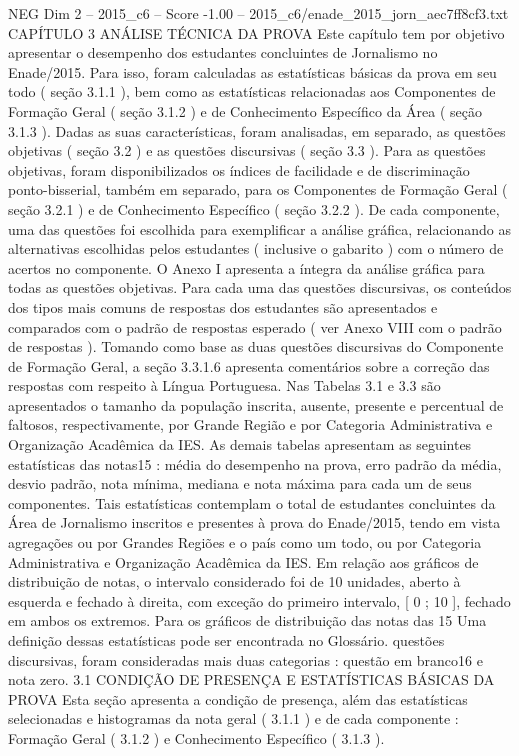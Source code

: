 \begin{textsample}{NEG Dim 2 – 2015\_c6 – Score -1.00 – 2015\_c6/enade\_2015\_jorn\_aec7ff8cf3.txt}  \label{ex:f2_neg_200}
CAPÍTULO 3 ANÁLISE TÉCNICA DA PROVA Este capítulo tem por objetivo apresentar o desempenho dos estudantes concluintes de Jornalismo no Enade/2015.
Para isso, foram calculadas as estatísticas básicas da prova em seu todo ( seção 3.1.1 ), bem como as estatísticas relacionadas aos Componentes de Formação Geral ( seção 3.1.2 ) e de Conhecimento Específico da Área ( seção 3.1.3 ).
Dadas as suas características, foram analisadas, em separado, as questões objetivas ( seção 3.2 ) e as questões discursivas ( seção 3.3 ).
Para as questões objetivas, foram disponibilizados os índices de facilidade e de discriminação ponto-bisserial, também em separado, para os Componentes de Formação Geral ( seção 3.2.1 ) e de Conhecimento Específico ( seção 3.2.2 ).
De cada componente, uma das questões foi escolhida para exemplificar a análise gráfica, relacionando as alternativas escolhidas pelos estudantes ( inclusive o gabarito ) com o número de acertos no componente.
O Anexo I apresenta a íntegra da análise gráfica para todas as questões objetivas.
Para cada uma das questões discursivas, os conteúdos dos tipos mais comuns de respostas dos estudantes são apresentados e comparados com o padrão de respostas esperado ( ver Anexo VIII com o padrão de respostas ).
Tomando como base as duas questões discursivas do Componente de Formação Geral, a seção 3.3.1.6 apresenta comentários sobre a correção das respostas com respeito à Língua Portuguesa.
Nas Tabelas 3.1 e 3.3 são apresentados o tamanho da população inscrita, ausente, presente e percentual de faltosos, respectivamente, por Grande Região e por Categoria Administrativa e Organização Acadêmica da IES.
As demais tabelas apresentam as seguintes estatísticas das notas15 : média do desempenho na prova, erro padrão da média, desvio padrão, nota mínima, mediana e nota máxima para cada um de seus componentes.
Tais estatísticas contemplam o total de estudantes concluintes da Área de Jornalismo inscritos e presentes à prova do Enade/2015, tendo em vista agregações ou por Grandes Regiões e o país como um todo, ou por Categoria Administrativa e Organização Acadêmica da IES.
Em relação aos gráficos de distribuição de notas, o intervalo considerado foi de 10 unidades, aberto à esquerda e fechado à direita, com exceção do primeiro intervalo, [ 0 ; 10 ], fechado em ambos os extremos.
Para os gráficos de distribuição das notas das 15 Uma definição dessas estatísticas pode ser encontrada no Glossário. questões discursivas, foram consideradas mais duas categorias : questão em branco16 e nota zero. 3.1 CONDIÇÃO DE PRESENÇA E ESTATÍSTICAS BÁSICAS DA PROVA Esta seção apresenta a condição de presença, além das estatísticas selecionadas e histogramas da nota geral ( 3.1.1 ) e de cada componente : Formação Geral ( 3.1.2 ) e Conhecimento Específico ( 3.1.3 ).

\end{textsample}

